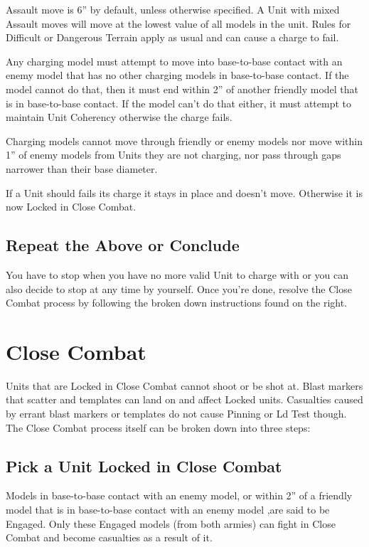 Assault move is 6” by default, unless otherwise specified. A
Unit with mixed Assault moves will move at the lowest value of
all models in the unit. Rules for Difficult or Dangerous Terrain
apply as usual and can cause a charge to fail.

Any charging model must attempt to move into base-to-base
contact with an enemy model that has no other charging
models in base-to-base contact. If the model cannot do that,
then it must end within 2” of another friendly model that is in
base-to-base contact. If the model can't do that either, it must
attempt to maintain Unit Coherency otherwise the charge fails.

Charging models cannot move through friendly or enemy
models nor move within 1” of enemy models from Units they
are not charging, nor pass through gaps narrower than their
base diameter.

If a Unit should fails its charge it stays in place and doesn't
move. Otherwise it is now Locked in Close Combat.

\subsection{Repeat the Above or Conclude}
You have to stop when you have no more valid Unit to charge
with or you can also decide to stop at any time by yourself.
Once you're done, resolve the Close Combat process by
following the broken down instructions found on the right.

\stopcountsubsections

\section{Close Combat}

Units that are Locked in Close Combat cannot shoot or be shot
at. Blast markers that scatter and templates can land on and
affect Locked units. Casualties caused by errant blast markers
or templates do not cause Pinning or Ld Test though.
The Close Combat process itself can be broken down into
three steps:

\countsubsections

\subsection{Pick a Unit Locked in Close Combat}

Models in base-to-base contact with an enemy model, or
within 2” of a friendly model that is in base-to-base contact with
an enemy model ,are said to be Engaged. Only these
Engaged models (from both armies) can fight in Close Combat
and become casualties as a result of it.


